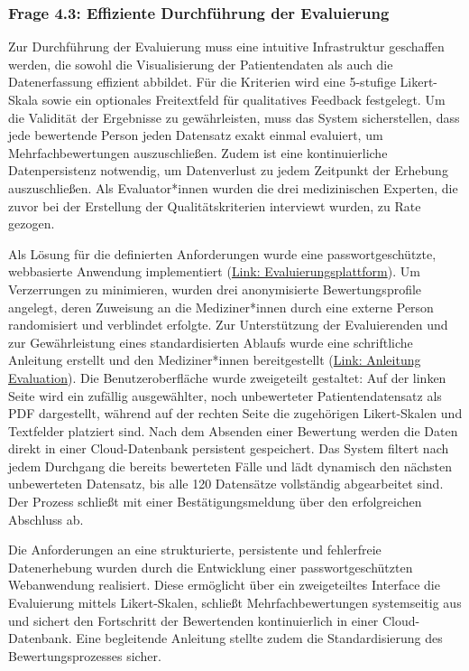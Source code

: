\subsubsection{Frage 4.3: Effiziente Durchführung der Evaluierung}
\begin{description}[style=nextline, font=\bfseries]
\item[Methodik] Zur Durchführung der Evaluierung muss eine intuitive Infrastruktur geschaffen werden, die sowohl die Visualisierung der Patientendaten als auch die Datenerfassung effizient abbildet. Für die Kriterien wird eine 5-stufige Likert-Skala sowie ein optionales Freitextfeld für qualitatives Feedback festgelegt. Um die Validität der Ergebnisse zu gewährleisten, muss das System sicherstellen, dass jede bewertende Person jeden Datensatz exakt einmal evaluiert, um Mehrfachbewertungen auszuschließen. Zudem ist eine kontinuierliche Datenpersistenz notwendig, um Datenverlust zu jedem Zeitpunkt der Erhebung auszuschließen. Als Evaluator*innen wurden die drei medizinischen Experten, die zuvor bei der Erstellung der Qualitätskriterien interviewt wurden, zu Rate gezogen.

\item[Ergebnisse] Als Lösung für die definierten Anforderungen wurde eine passwortgeschützte, webbasierte Anwendung implementiert (\href{https://researchproject.rhefner.de/evaluation/index.html}{Link: Evaluierungsplattform}). Um Verzerrungen zu minimieren, wurden drei anonymisierte Bewertungsprofile angelegt, deren Zuweisung an die Mediziner*innen durch eine externe Person randomisiert und verblindet erfolgte. Zur Unterstützung der Evaluierenden und zur Gewährleistung eines standardisierten Ablaufs wurde eine schriftliche Anleitung erstellt und den Mediziner*innen bereitgestellt (\href{https://github.com/robinhefner/Research-Project/blob/5359f58b92f2480c59e9677c2e41ec0f7c742b21/Anleitung_Evaluation.pdf}{Link: Anleitung Evaluation}). Die Benutzeroberfläche wurde zweigeteilt gestaltet: Auf der linken Seite wird ein zufällig ausgewählter, noch unbewerteter Patientendatensatz als PDF dargestellt, während auf der rechten Seite die zugehörigen Likert-Skalen und Textfelder platziert sind. Nach dem Absenden einer Bewertung werden die Daten direkt in einer Cloud-Datenbank persistent gespeichert. Das System filtert nach jedem Durchgang die bereits bewerteten Fälle und lädt dynamisch den nächsten unbewerteten Datensatz, bis alle 120 Datensätze vollständig abgearbeitet sind. Der Prozess schließt mit einer Bestätigungsmeldung über den erfolgreichen Abschluss ab.

\item[Beantwortung] Die Anforderungen an eine strukturierte, persistente und fehlerfreie Datenerhebung wurden durch die Entwicklung einer passwortgeschützten Webanwendung realisiert. Diese ermöglicht über ein zweigeteiltes Interface die Evaluierung mittels Likert-Skalen, schließt Mehrfachbewertungen systemseitig aus und sichert den Fortschritt der Bewertenden kontinuierlich in einer Cloud-Datenbank. Eine begleitende Anleitung stellte zudem die Standardisierung des Bewertungsprozesses sicher.
\end{description}

